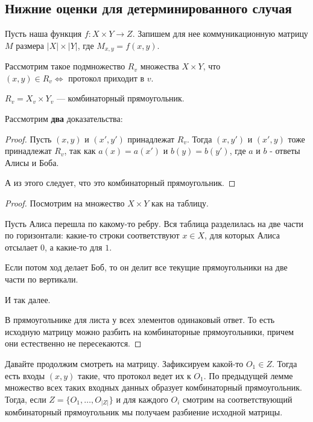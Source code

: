 \subsection{Нижние оценки для детерминированного случая}
Пусть наша функция $ f\colon X \times Y \to  Z$. 
Запишем  для нее коммуникационную матрицу $ M$ размера $ \lvert X \rvert \times \lvert Y \rvert $, где $ M_{x, y} = f(x, y)$.

Рассмотрим такое подмножество $ R_v$ множества $ X \times Y$, что $(x, y) \in R_v \Longleftrightarrow \text{ протокол приходит в }  v$.

\begin{lm}\label{lm:lm3}
	$ R_v = X_v \times Y_v$ --- комбинаторный прямоугольник.
\end{lm}
Рассмотрим \textbf{два} доказательства:
\begin{proof}
	Пусть $ (x, y)$ и  $ (x', y')$ принадлежат  $ R_v$. Тогда  $ (x, y')$ и  $ (x', y)$ тоже принадлежат  $ R_v$, так как $ a(x) = a(x')$ и  $ b(y) = b(y')$, где $ a$ и $ b$ - ответы Алисы и Боба.

	А из этого следует, что это комбинаторный прямоугольник.
\end{proof}
\begin{proof}
	Посмотрим на множество $ X\times Y$ как на таблицу.

    Пусть Алиса перешла по какому-то ребру. Вся таблица разделилась на две части по горизонтали: какие-то строки соответствуют $ x \in X$, для которых Алиса отсылает  $ 0$, а какие-то для $ 1$. 

	Если потом ход делает Боб, то он делит все текущие прямоугольники на две части по вертикали. 

И так далее.

В прямоугольнике для листа у всех элементов одинаковый ответ. То есть исходную матрицу можно разбить на комбинаторные прямоугольники, причем они естественно не пересекаются.
\end{proof}

\vspace{1em}
Давайте продолжим смотреть на матрицу. Зафиксируем какой-то $O_1 \in Z$. Тогда есть входы $(x,y)$ такие, что протокол ведет их к $O_1$. По предыдущей лемме множество всех таких входных данных образует комбинаторный прямоугольник. Тогда, если $Z = \{ O_1, \dots, O_{|Z|}\}$ и для каждого $O_i$ смотрим на соответствующий комбинаторный прямоугольник мы получаем разбиение исходной матрицы. 

